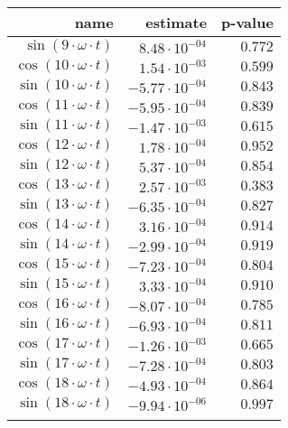 \begin{tabular}{r|rr}
\hline
 name                            & estimate               & p-value   \\
\hline
 $\sin(9 \cdot \omega \cdot t)$  & $8.48 \cdot 10^{-04}$  & $0.772$   \\
 $\cos(10 \cdot \omega \cdot t)$ & $1.54 \cdot 10^{-03}$  & $0.599$   \\
 $\sin(10 \cdot \omega \cdot t)$ & $-5.77 \cdot 10^{-04}$ & $0.843$   \\
 $\cos(11 \cdot \omega \cdot t)$ & $-5.95 \cdot 10^{-04}$ & $0.839$   \\
 $\sin(11 \cdot \omega \cdot t)$ & $-1.47 \cdot 10^{-03}$ & $0.615$   \\
 $\cos(12 \cdot \omega \cdot t)$ & $1.78 \cdot 10^{-04}$  & $0.952$   \\
 $\sin(12 \cdot \omega \cdot t)$ & $5.37 \cdot 10^{-04}$  & $0.854$   \\
 $\cos(13 \cdot \omega \cdot t)$ & $2.57 \cdot 10^{-03}$  & $0.383$   \\
 $\sin(13 \cdot \omega \cdot t)$ & $-6.35 \cdot 10^{-04}$ & $0.827$   \\
 $\cos(14 \cdot \omega \cdot t)$ & $3.16 \cdot 10^{-04}$  & $0.914$   \\
 $\sin(14 \cdot \omega \cdot t)$ & $-2.99 \cdot 10^{-04}$ & $0.919$   \\
 $\cos(15 \cdot \omega \cdot t)$ & $-7.23 \cdot 10^{-04}$ & $0.804$   \\
 $\sin(15 \cdot \omega \cdot t)$ & $3.33 \cdot 10^{-04}$  & $0.910$   \\
 $\cos(16 \cdot \omega \cdot t)$ & $-8.07 \cdot 10^{-04}$ & $0.785$   \\
 $\sin(16 \cdot \omega \cdot t)$ & $-6.93 \cdot 10^{-04}$ & $0.811$   \\
 $\cos(17 \cdot \omega \cdot t)$ & $-1.26 \cdot 10^{-03}$ & $0.665$   \\
 $\sin(17 \cdot \omega \cdot t)$ & $-7.28 \cdot 10^{-04}$ & $0.803$   \\
 $\cos(18 \cdot \omega \cdot t)$ & $-4.93 \cdot 10^{-04}$ & $0.864$   \\
 $\sin(18 \cdot \omega \cdot t)$ & $-9.94 \cdot 10^{-06}$ & $0.997$   \\
                                 &                        &           \\
\hline
\end{tabular}